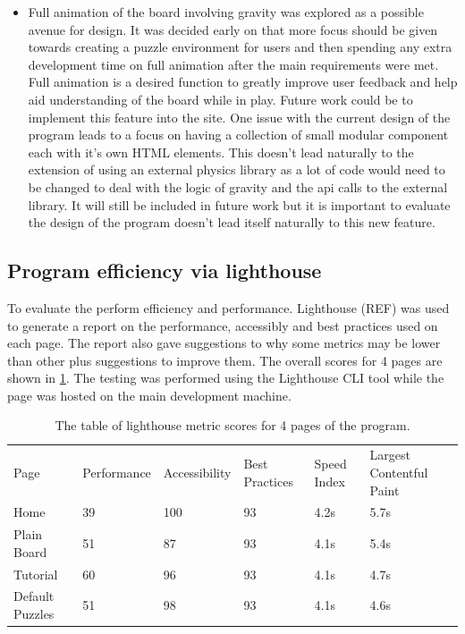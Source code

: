 \documentclass{l4proj}
\begin{document}
\begin{itemize}
    \item Full animation of the board involving gravity was explored as a possible avenue for design. It was decided early on that more focus should be given towards creating a puzzle environment for users and then spending any extra development time on full animation after the main requirements were met. Full animation is a desired function to greatly improve user feedback and help aid understanding of the board while in play. Future work could be to implement this feature into the site. One issue with the current design of the program leads to a focus on having a collection of small modular component each with it's own HTML elements. This doesn't lead naturally to the extension of using an external physics library as a lot of code would need to be changed to deal with the logic of gravity and the api calls to the external library. It will still be included in future work but it is important to evaluate the design of the program doesn't lead itself naturally to this new feature.   
\end{itemize}

\subsection{Program efficiency via lighthouse}
To evaluate the perform efficiency and performance. Lighthouse (REF) was used to generate a report on the performance, accessibly and best practices used on each page. The report also gave suggestions to why some metrics may be lower than other plus suggestions to improve them. The overall scores for 4 pages are shown in \ref{tab:lighthouse}. The testing was performed using the Lighthouse CLI tool while the page was hosted on the main development machine. 

\begin{table}[]
    \caption{The table of lighthouse metric scores for 4 pages of the program.}\label{tab:lighthouse}
    \begin{tabular}{llllll}
    Page            & Performance & Accessibility & Best Practices & Speed Index & Largest Contentful Paint \\
    Home            & 39          & 100           & 93             & 4.2s        & 5.7s                     \\
    Plain Board     & 51          & 87            & 93             & 4.1s        & 5.4s                     \\
    Tutorial        & 60          & 96            & 93             & 4.1s        & 4.7s                     \\
    Default Puzzles & 51          & 98            & 93             & 4.1s        & 4.6s                    
    \end{tabular}
    \end{table}
\end{document}

